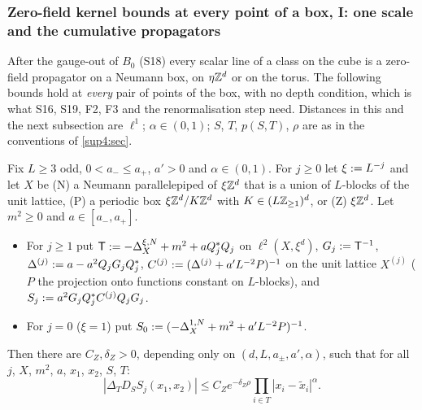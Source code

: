 
\subsubsection{Zero-field kernel bounds at every point of a box, I: one scale and the cumulative propagators}\label{sup4:ssec:zeroA}

After the gauge-out of $B_0$ (S18) every scalar line of a class on the cube is a zero-field propagator on a Neumann box, on $\eta\mathbb Z^d$ or on the torus. The following bounds hold at \emph{every} pair of points of the box, with no depth condition, which is what S16, S19, F2, F3 and the renormalisation step need. Distances in this and the next subsection are $\ell^1$; $\alpha\in(0,1)$; $S$, $T$, $p(S,T)$, $\rho$ are as in the conventions of \cref{sup4:sec}.

\begin{lemma}\label{sup4:lem:Z}
Fix $L\ge3$ odd, $0<a_-\le a_+$, $a'>0$ and $\alpha\in(0,1)$. For $j\ge0$ let $\xi:= L^{-j}$ and let $X$ be \textup{(N)} a Neumann parallelepiped of $\xi\mathbb Z^d$ that is a union of $L$-blocks of the unit lattice, \textup{(P)} a periodic box $\xi\mathbb Z^d/K\mathbb Z^d$ with $K\in(L\mathbb Z_{\ge1})^d$, or \textup{(Z)} $\xi\mathbb Z^d$. Let $m^2\ge0$ and $a\in[a_-,a_+]$.
\begin{itemize}[nosep,leftmargin=*]
\item For $j\ge1$ put $\mathsf T:=-\Delta^{\xi,N}_X+m^2+aQ_j^*Q_j$ on $\ell^2(X,\xi^d)$, $G_j:=\mathsf T^{-1}$, $\Delta^{(j)}:= a-a^2Q_jG_jQ_j^*$, $C^{(j)}:=(\Delta^{(j)}+a'L^{-2}P)^{-1}$ on the unit lattice $X^{(j)}$ ($P$ the projection onto functions constant on $L$-blocks), and $S_j:= a^2G_jQ_j^*C^{(j)}Q_jG_j$.
\item For $j=0$ ($\xi=1$) put $S_0:=(-\Delta^{1,N}_X+m^2+a'L^{-2}P)^{-1}$.
\end{itemize}
Then there are $C_Z,\delta_Z>0$, depending only on $(d,L,a_\pm,a',\alpha)$, such that for all $j$, $X$, $m^2$, $a$, $x_1$, $x_2$, $S$, $T$:
\begin{equation}\label{sup4:eq:Z}
|\Delta_TD_SS_j(x_1,x_2)|\le C_Ze^{-\delta_Z\rho}\prod_{i\in T}|x_i-\tilde x_i|^\alpha.
\end{equation}
\end{lemma}

